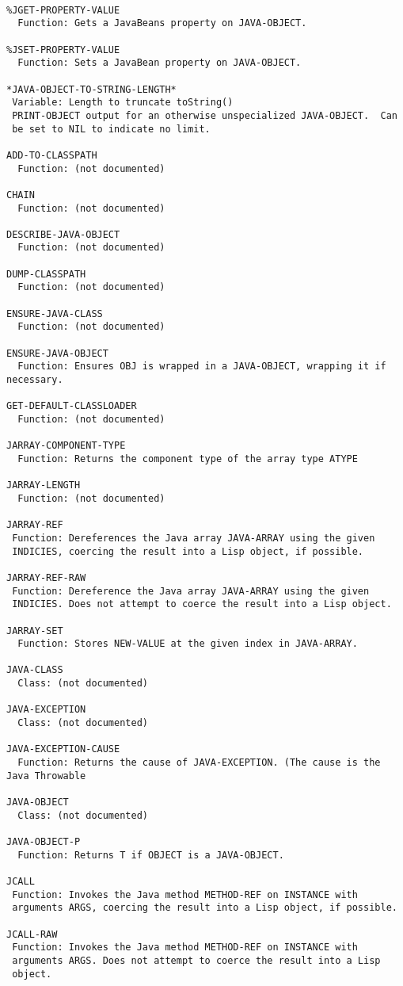 \begin{verbatim}

%JGET-PROPERTY-VALUE
  Function: Gets a JavaBeans property on JAVA-OBJECT.

%JSET-PROPERTY-VALUE
  Function: Sets a JavaBean property on JAVA-OBJECT.

*JAVA-OBJECT-TO-STRING-LENGTH* 
 Variable: Length to truncate toString()
 PRINT-OBJECT output for an otherwise unspecialized JAVA-OBJECT.  Can
 be set to NIL to indicate no limit.

ADD-TO-CLASSPATH
  Function: (not documented)

CHAIN
  Function: (not documented)

DESCRIBE-JAVA-OBJECT
  Function: (not documented)

DUMP-CLASSPATH
  Function: (not documented)

ENSURE-JAVA-CLASS
  Function: (not documented)

ENSURE-JAVA-OBJECT
  Function: Ensures OBJ is wrapped in a JAVA-OBJECT, wrapping it if necessary.

GET-DEFAULT-CLASSLOADER
  Function: (not documented)

JARRAY-COMPONENT-TYPE
  Function: Returns the component type of the array type ATYPE

JARRAY-LENGTH
  Function: (not documented)

JARRAY-REF
 Function: Dereferences the Java array JAVA-ARRAY using the given
 INDICIES, coercing the result into a Lisp object, if possible.

JARRAY-REF-RAW
 Function: Dereference the Java array JAVA-ARRAY using the given
 INDICIES. Does not attempt to coerce the result into a Lisp object.

JARRAY-SET
  Function: Stores NEW-VALUE at the given index in JAVA-ARRAY.

JAVA-CLASS
  Class: (not documented)

JAVA-EXCEPTION
  Class: (not documented)

JAVA-EXCEPTION-CAUSE
  Function: Returns the cause of JAVA-EXCEPTION. (The cause is the Java Throwable

JAVA-OBJECT
  Class: (not documented)

JAVA-OBJECT-P
  Function: Returns T if OBJECT is a JAVA-OBJECT.

JCALL
 Function: Invokes the Java method METHOD-REF on INSTANCE with
 arguments ARGS, coercing the result into a Lisp object, if possible.

JCALL-RAW
 Function: Invokes the Java method METHOD-REF on INSTANCE with
 arguments ARGS. Does not attempt to coerce the result into a Lisp
 object.


\end{verbatim}

